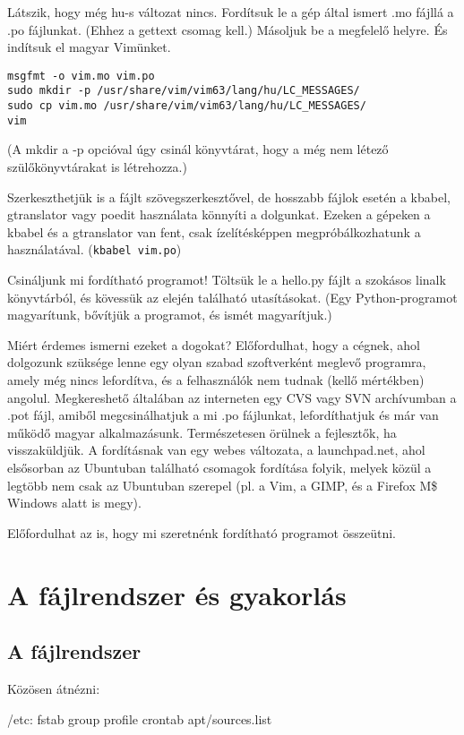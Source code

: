 \documentclass[a4paper]{article}
\newcommand{\code}{\texttt}
\begin{document}
Látszik, hogy még hu-s változat nincs. Fordítsuk le a gép által ismert
.mo fájllá a .po fájlunkat. (Ehhez a gettext csomag kell.) Másoljuk be
a megfelelő helyre. És indítsuk el magyar Vimünket.
\begin{Verbatim}
msgfmt -o vim.mo vim.po
sudo mkdir -p /usr/share/vim/vim63/lang/hu/LC_MESSAGES/
sudo cp vim.mo /usr/share/vim/vim63/lang/hu/LC_MESSAGES/
vim
\end{Verbatim}
(A mkdir a -p opcióval úgy csinál könyvtárat, hogy a még nem létező
szülőkönyvtárakat is létrehozza.)

Szerkeszthetjük is a fájlt szövegszerkesztővel, de hosszabb fájlok
esetén a kbabel, gtranslator vagy poedit használata könnyíti a
dolgunkat. Ezeken a gépeken a kbabel és a gtranslator van fent, csak ízelítésképpen
megpróbálkozhatunk a használatával. (\code{kbabel vim.po})

Csináljunk mi fordítható programot! Töltsük le a hello.py
fájlt a szokásos linalk könyvtárból, és kövessük az elején található
utasításokat.  (Egy Python-programot  magyarítunk, bővítjük a programot,
és ismét magyarítjuk.)

Miért érdemes ismerni ezeket a dogokat? Előfordulhat, hogy a cégnek,
ahol dolgozunk szüksége lenne egy olyan szabad szoftverként meglevő
programra, amely még nincs lefordítva, és a felhasználók nem tudnak
(kellő mértékben) angolul. Megkereshető általában az interneten egy CVS
vagy SVN archívumban a .pot fájl, amiből megcsinálhatjuk a mi .po
fájlunkat, lefordíthatjuk és már van működő magyar alkalmazásunk.
Természetesen örülnek a fejlesztők, ha visszaküldjük. A fordításnak van
egy webes változata, a launchpad.net, ahol elsősorban az Ubuntuban
található csomagok fordítása folyik, melyek közül a legtöbb nem csak az
Ubuntuban szerepel (pl. a Vim, a GIMP, és a Firefox M\$ Windows alatt is
megy).

Előfordulhat az is, hogy mi szeretnénk fordítható programot összeütni.

\newpage
\section{A fájlrendszer és gyakorlás}

\subsection{A fájlrendszer}
Közösen átnézni:

/etc: fstab group profile crontab apt/sources.list
\end{document}
